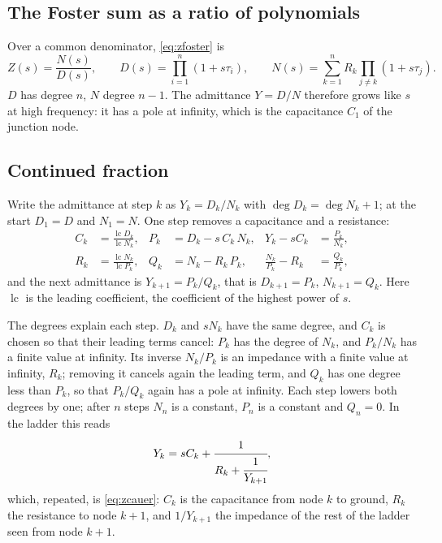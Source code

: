 \documentclass[10pt,a4paper]{scrartcl}
\newcommand{\lc}{\operatorname{lc}}
\begin{document}
\subsection{The Foster sum as a ratio of polynomials}
Over a common denominator, \eqref{eq:zfoster} is
\begin{equation}
Z(s) = \frac{N(s)}{D(s)} , \qquad D(s) = \prod_{i=1}^{n} (1 + s\tau_i) , \qquad N(s) = \sum_{k=1}^{n} R_k \prod_{j \neq k} (1 + s\tau_j) .
\label{eq:nd}
\end{equation}
$D$ has degree $n$, $N$ degree $n-1$. The admittance $Y = D/N$ therefore grows like $s$ at high frequency: it has a pole at infinity, which is the capacitance $C_1$ of the junction node.

\subsection{Continued fraction}
\label{sec:cf}
Write the admittance at step $k$ as $Y_k = D_k/N_k$ with $\deg D_k = \deg N_k + 1$; at the start $D_1 = D$ and $N_1 = N$. One step removes a capacitance and a resistance:
\begin{align}
C_k &= \frac{\lc D_k}{\lc N_k} , & P_k &= D_k - s\,C_k\, N_k , & Y_k - sC_k &= \frac{P_k}{N_k} , \label{eq:stepC}\\
R_k &= \frac{\lc N_k}{\lc P_k} , & Q_k &= N_k - R_k\, P_k , & \frac{N_k}{P_k} - R_k &= \frac{Q_k}{P_k} , \label{eq:stepR}
\end{align}
and the next admittance is $Y_{k+1} = P_k/Q_k$, that is $D_{k+1} = P_k$, $N_{k+1} = Q_k$. Here $\lc$ is the leading coefficient, the coefficient of the highest power of $s$.

The degrees explain each step. $D_k$ and $sN_k$ have the same degree, and $C_k$ is chosen so that their leading terms cancel: $P_k$ has the degree of $N_k$, and $P_k/N_k$ has a finite value at infinity. Its inverse $N_k/P_k$ is an impedance with a finite value at infinity, $R_k$; removing it cancels again the leading term, and $Q_k$ has one degree less than $P_k$, so that $P_k/Q_k$ again has a pole at infinity. Each step lowers both degrees by one; after $n$ steps $N_n$ is a constant, $P_n$ is a constant and $Q_n = 0$. In the ladder this reads
\begin{equation}
Y_k = sC_k + \cfrac{1}{R_k + \cfrac{1}{Y_{k+1}}} ,
\end{equation}
which, repeated, is \eqref{eq:zcauer}: $C_k$ is the capacitance from node $k$ to ground, $R_k$ the resistance to node $k+1$, and $1/Y_{k+1}$ the impedance of the rest of the ladder seen from node $k+1$.
\end{document}
